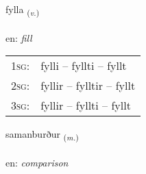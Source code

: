 \documentclass[frontgrid, backgrid]{flacards}\usepackage[]{graphicx}\usepackage[]{color}
\begin{document}
\renewcommand{\flhead}{\vskip5pt \fboxsep=0pt {\small\bfseries\footnotesize Sagnorð | Verb}}
\renewcommand{\fcfoot}{\vskip5pt \fboxsep=0pt \hspace{2pt}{\small\bfseries\footnotesize 2K}}

\renewcommand{\blhead}{\vskip5pt {\small\bfseries\footnotesize Sagnorð | Verb }}
\renewcommand{\bcfoot}{\vskip5pt \hspace{2pt}{\small\bfseries\footnotesize 2K}}


{fylla \small{\textsubscript{(\textit{v.})}} \\[1ex] %
\textphonetic{[fɪtla]} \\
en: \emph{fill} \\  [2ex]
\renewcommand*{\arraystretch}{0.8}
\begin{tabular}{p{1cm}l}
\textsc{1sg}: & fylli -- fyllti -- fyllt \\ 
\textsc{2sg}: & fyllir -- fylltir -- fyllt \\ 
\textsc{3sg}: & fyllir -- fyllti -- fyllt \\ 
\end{tabular}
}

\renewcommand{\flhead}{\vskip5pt \fboxsep=0pt {\small\bfseries\footnotesize Nafnorð | Noun}}
\renewcommand{\fcfoot}{\vskip5pt \fboxsep=0pt \hspace{2pt}{\small\bfseries\footnotesize 2K}}

\renewcommand{\blhead}{\vskip5pt {\small\bfseries\footnotesize Nafnorð | Noun }}
\renewcommand{\bcfoot}{\vskip5pt \hspace{2pt}{\small\bfseries\footnotesize 2K}}


{samanburður \small{\textsubscript{(\textit{m.})}} \\[1ex] %
\textphonetic{[saːmanpʏrðʏr]} \\
en: \emph{comparison} \\  [2ex]
\renewcommand*{\arraystretch}{0.8}
}
\end{document}
